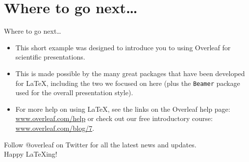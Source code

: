 \documentclass{beamer}
\begin{document}
\section{Where to go next\dots{}}

\begin{frame}{Where to go next\dots{}}

\begin{itemize}
\item This short example was designed to introduce you to using Overleaf for scientific presentations.
\item This is made possible by the many great packages that have been developed for \LaTeX{}, including the two we focused on here (plus the \texttt{Beamer} package used for the overall presentation style). 
\item For more help on using \LaTeX{}, see the links on the Overleaf help page: \url{www.overleaf.com/help} or check out our free introductory course: \url{www.overleaf.com/blog/7}.
\end{itemize}

\begin{center}
Follow @overleaf on Twitter for all the latest news and updates.\\[0.3cm]
Happy \LaTeX ing!
\end{center}

\end{frame}
\end{document}
